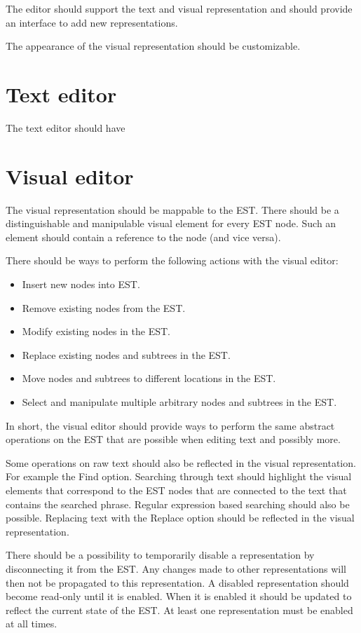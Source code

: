 The editor should support the text and visual representation and should provide an interface to add new representations.

The appearance of the visual representation should be customizable.


\section{Text editor}
The text editor should have 

\section{Visual editor}
The visual representation should be mappable to the EST. There should be a distinguishable and manipulable visual element for every EST node. Such an element should contain a reference to the node (and vice versa).

There should be ways to perform the following actions with the visual editor:
\begin{itemize}
\item Insert new nodes into EST.
\item Remove existing nodes from the EST.
\item Modify existing nodes in the EST.
\item Replace existing nodes and subtrees in the EST.
\item Move nodes and subtrees to different locations in the EST.
\item Select and manipulate multiple arbitrary nodes and subtrees in the EST.
\end{itemize}

In short, the visual editor should provide ways to perform the same abstract operations on the EST that are possible when editing text and possibly more.

Some operations on raw text should also be reflected in the visual representation. For example the Find option. Searching through text should highlight the visual elements that correspond to the EST nodes that are connected to the text that contains the searched phrase. Regular expression based searching should also be possible. Replacing text with the Replace option should be reflected in the visual representation.

There should be a possibility to temporarily disable a representation by disconnecting it from the EST. Any changes made to other representations will then not be propagated to this representation. A disabled representation should become read-only until it is enabled. When it is enabled it should be updated to reflect the current state of the EST. At least one representation must be enabled at all times.


